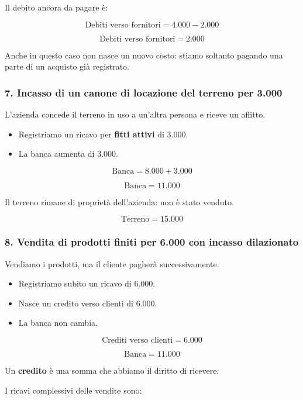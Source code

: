 \noindent Il debito ancora da pagare è:

\[
\text{Debiti verso fornitori}=4.000-2.000
\]

\[
\boxed{\text{Debiti verso fornitori}=2.000}
\]

\noindent Anche in questo caso non nasce un nuovo costo:
stiamo soltanto pagando una parte di un acquisto
già registrato.

\subsubsection*{7. Incasso di un canone di locazione
del terreno per 3.000}

\noindent L'azienda concede il terreno in uso
a un'altra persona e riceve un affitto.

\begin{itemize}
    \item Registriamo un ricavo per
    \textbf{fitti attivi} di 3.000.
    \item La banca aumenta di 3.000.
\end{itemize}

\[
\text{Banca}=8.000+3.000
\]

\[
\boxed{\text{Banca}=11.000}
\]

\noindent Il terreno rimane di proprietà dell'azienda:
non è stato venduto.

\[
\boxed{\text{Terreno}=15.000}
\]

\subsubsection*{8. Vendita di prodotti finiti per 6.000
con incasso dilazionato}

\noindent Vendiamo i prodotti, ma il cliente
pagherà successivamente.

\begin{itemize}
    \item Registriamo subito un ricavo di 6.000.
    \item Nasce un credito verso clienti di 6.000.
    \item La banca non cambia.
\end{itemize}

\[
\boxed{\text{Crediti verso clienti}=6.000}
\]

\[
\boxed{\text{Banca}=11.000}
\]

\noindent Un \textbf{credito} è una somma
che abbiamo il diritto di ricevere.

\noindent I ricavi complessivi delle vendite sono:

